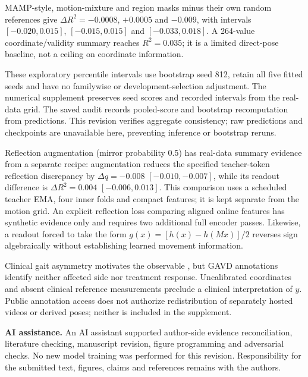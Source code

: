 \documentclass{article}
\begin{document}
MAMP-style, motion-mixture and region masks minus their own random
references give \(\Delta R^2=-0.0008\), \(+0.0005\) and \(-0.009\), with
intervals \([-0.020,0.015]\), \([-0.015,0.015]\) and \([-0.033,0.018]\).
A 264-value coordinate/validity summary reaches \(R^2=0.035\); it is a
limited direct-pose baseline, not a ceiling on coordinate information.

These exploratory percentile intervals use bootstrap seed 812, retain
all five fitted seeds and have no familywise or development-selection
adjustment. The numerical supplement preserves seed scores and recorded
intervals from the real-data grid. The saved audit records pooled-score
and bootstrap recomputation from predictions. This revision verifies
aggregate consistency; raw predictions and checkpoints are unavailable
here, preventing inference or bootstrap reruns.

Reflection augmentation (mirror probability 0.5) has real-data summary
evidence from a separate recipe: augmentation reduces the specified
teacher-token reflection discrepancy by \(\Delta q=-0.008\)
\([-0.010,-0.007]\), while its readout difference is
\(\Delta R^2=0.004\) \([-0.006,0.013]\). This comparison uses a
scheduled teacher EMA, four inner folds and compact features; it is kept
separate from the motion grid. An explicit reflection loss comparing
aligned online features has synthetic evidence only and requires two
additional full encoder passes. Likewise, a readout forced to take the
form \(g(x)=[h(x)-h(Mx)]/2\) reverses sign algebraically without
establishing learned movement information.

Clinical gait asymmetry motivates the observable \citep{stroke}, but
GAVD annotations identify neither affected side nor treatment response.
Uncalibrated coordinates and absent clinical reference measurements
preclude a clinical interpretation of \(y\). Public annotation access
does not authorize redistribution of separately hosted videos or derived
poses; neither is included in the supplement.

\textbf{AI assistance.} An AI assistant supported author-side evidence
reconciliation, literature checking, manuscript revision, figure
programming and adversarial checks. No new model training was performed
for this revision. Responsibility for the submitted text, figures,
claims and references remains with the authors.
\end{document}
